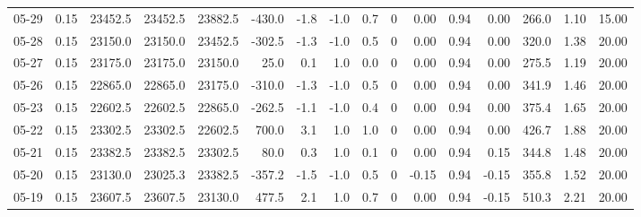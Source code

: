 \begin{threeparttable}
{\begin{tabular}{lrrrrrrrrrrrrrrr}
  05-29 &     0.15 & 23452.5 & 23452.5 & 23882.5 &     -430.0 &           -1.8 &                     -1.0 &                 0.7 &              0 &       0.00 &      0.94 &           0.00 &            266.0 &            1.10 &                  15.00 \\
  05-28 &     0.15 & 23150.0 & 23150.0 & 23452.5 &     -302.5 &           -1.3 &                     -1.0 &                 0.5 &              0 &       0.00 &      0.94 &           0.00 &            320.0 &            1.38 &                  20.00 \\
  05-27 &     0.15 & 23175.0 & 23175.0 & 23150.0 &       25.0 &            0.1 &                      1.0 &                 0.0 &              0 &       0.00 &      0.94 &           0.00 &            275.5 &            1.19 &                  20.00 \\
  05-26 &     0.15 & 22865.0 & 22865.0 & 23175.0 &     -310.0 &           -1.3 &                     -1.0 &                 0.5 &              0 &       0.00 &      0.94 &           0.00 &            341.9 &            1.46 &                  20.00 \\
  05-23 &     0.15 & 22602.5 & 22602.5 & 22865.0 &     -262.5 &           -1.1 &                     -1.0 &                 0.4 &              0 &       0.00 &      0.94 &           0.00 &            375.4 &            1.65 &                  20.00 \\
  05-22 &     0.15 & 23302.5 & 23302.5 & 22602.5 &      700.0 &            3.1 &                      1.0 &                 1.0 &              0 &       0.00 &      0.94 &           0.00 &            426.7 &            1.88 &                  20.00 \\
  05-21 &     0.15 & 23382.5 & 23382.5 & 23302.5 &       80.0 &            0.3 &                      1.0 &                 0.1 &              0 &       0.00 &      0.94 &           0.15 &            344.8 &            1.48 &                  20.00 \\
  05-20 &     0.15 & 23130.0 & 23025.3 & 23382.5 &     -357.2 &           -1.5 &                     -1.0 &                 0.5 &              0 &      -0.15 &      0.94 &          -0.15 &            355.8 &            1.52 &                  20.00 \\
  05-19 &     0.15 & 23607.5 & 23607.5 & 23130.0 &      477.5 &            2.1 &                      1.0 &                 0.7 &              0 &       0.00 &      0.94 &          -0.15 &            510.3 &            2.21 &                  20.00 \\

\end{tabular}}
\end{threeparttable}

